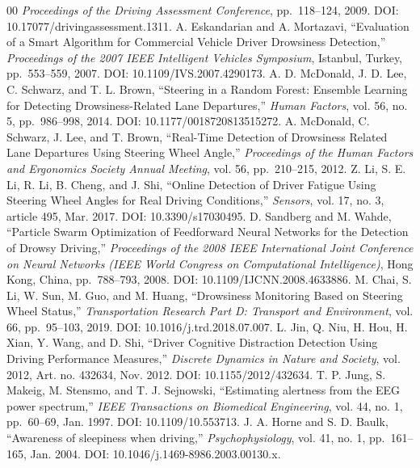\documentclass[letterpaper, 10 pt, conference]{ieeeconf}  %
\begin{document}
\begin{thebibliography}{00}
    \textit{Proceedings of the Driving Assessment Conference}, pp.~118--124, 2009. DOI: 10.17077/drivingassessment.1311.
 A. Eskandarian and A. Mortazavi,  
    ``Evaluation of a Smart Algorithm for Commercial Vehicle Driver Drowsiness Detection,''  
    \textit{Proceedings of the 2007 IEEE Intelligent Vehicles Symposium}, Istanbul, Turkey, pp.~553--559, 2007. DOI: 10.1109/IVS.2007.4290173.
 A. D. McDonald, J. D. Lee, C. Schwarz, and T. L. Brown,  
    ``Steering in a Random Forest: Ensemble Learning for Detecting Drowsiness-Related Lane Departures,''  
    \textit{Human Factors}, vol. 56, no. 5, pp.~986--998, 2014. DOI: 10.1177/0018720813515272.
 A. McDonald, C. Schwarz, J. Lee, and T. Brown,  
    ``Real-Time Detection of Drowsiness Related Lane Departures Using Steering Wheel Angle,''  
    \textit{Proceedings of the Human Factors and Ergonomics Society Annual Meeting}, vol. 56, pp.~210--215, 2012. %
 Z. Li, S. E. Li, R. Li, B. Cheng, and J. Shi,  
    ``Online Detection of Driver Fatigue Using Steering Wheel Angles for Real Driving Conditions,''  
    \textit{Sensors}, vol. 17, no. 3, article 495, Mar. 2017. DOI: 10.3390/s17030495.
 D. Sandberg and M. Wahde,  
    ``Particle Swarm Optimization of Feedforward Neural Networks for the Detection of Drowsy Driving,''  
    \textit{Proceedings of the 2008 IEEE International Joint Conference on Neural Networks (IEEE World Congress on Computational Intelligence)}, Hong Kong, China, pp.~788--793, 2008. DOI: 10.1109/IJCNN.2008.4633886.
 M. Chai, S. Li, W. Sun, M. Guo, and M. Huang,  
    ``Drowsiness Monitoring Based on Steering Wheel Status,''  
    \textit{Transportation Research Part D: Transport and Environment}, vol. 66, pp.~95--103, 2019. DOI: 10.1016/j.trd.2018.07.007.
 L. Jin, Q. Niu, H. Hou, H. Xian, Y. Wang, and D. Shi,  
    ``Driver Cognitive Distraction Detection Using Driving Performance Measures,''  
    \textit{Discrete Dynamics in Nature and Society}, vol. 2012, Art. no. 432634, Nov. 2012. DOI: 10.1155/2012/432634.
 T. P. Jung, S. Makeig, M. Stensmo, and T. J. Sejnowski,  
    ``Estimating alertness from the EEG power spectrum,''  
    \textit{IEEE Transactions on Biomedical Engineering}, vol. 44, no. 1, pp.~60--69, Jan. 1997. DOI: 10.1109/10.553713.
 J. A. Horne and S. D. Baulk,  
    ``Awareness of sleepiness when driving,''  
    \textit{Psychophysiology}, vol. 41, no. 1, pp.~161--165, Jan. 2004. DOI: 10.1046/j.1469-8986.2003.00130.x.

\end{thebibliography}
\end{document}

